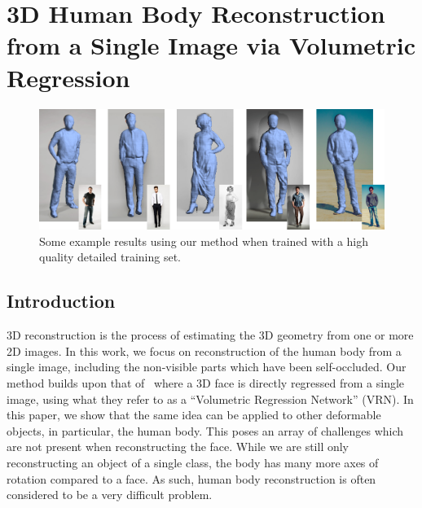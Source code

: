 \graphicspath{{chapter_humans/}}
\chapter{3D Human Body Reconstruction from a Single Image via
  Volumetric Regression}
\label{chapter:human}



\begin{figure}[h!]
  \centering
  \includegraphics[width=0.8\linewidth]{img/demo.png}
  \caption[Example reconstructions]{Some example results using our
    method when trained with a high quality detailed training set.}
  \label{fig:topdemo}
\end{figure}


\section{Introduction}


3D reconstruction is the process of estimating the 3D geometry from
one or more 2D images. In this work, we focus on reconstruction of the
human body from a single image, including the non-visible parts which
have been self-occluded. Our method builds upon that
of~\cite{jackson2017vrn} where a 3D face is directly regressed from a
single image, using what they refer to as a ``Volumetric Regression
Network'' (VRN). In this paper, we show that the same idea can be applied to
other deformable objects, in particular, the human body. This poses an
array of challenges which are not present when reconstructing the
face. While we are still only reconstructing an object of a single
class, the body has many more axes of rotation compared to a face. As
such, human body reconstruction is often considered to be a very
difficult problem.

